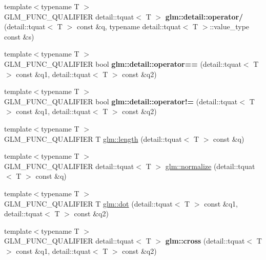 \begin{DoxyCompactItemize}
\item 
\hypertarget{namespaceglm_1_1detail_a47775e56016984a714086b0d4e1dc673}{}{\footnotesize template$<$typename T $>$ }\\G\+L\+M\+\_\+\+F\+U\+N\+C\+\_\+\+Q\+U\+A\+L\+I\+F\+I\+E\+R detail\+::tquat$<$ T $>$ {\bfseries glm\+::detail\+::operator/} (detail\+::tquat$<$ T $>$ const \&q, typename detail\+::tquat$<$ T $>$\+::value\+\_\+type const \&s)\label{namespaceglm_1_1detail_a47775e56016984a714086b0d4e1dc673}

\item 
\hypertarget{namespaceglm_1_1detail_a96329fbb8f896966d3c4d389ae2c9716}{}{\footnotesize template$<$typename T $>$ }\\G\+L\+M\+\_\+\+F\+U\+N\+C\+\_\+\+Q\+U\+A\+L\+I\+F\+I\+E\+R bool {\bfseries glm\+::detail\+::operator==} (detail\+::tquat$<$ T $>$ const \&q1, detail\+::tquat$<$ T $>$ const \&q2)\label{namespaceglm_1_1detail_a96329fbb8f896966d3c4d389ae2c9716}

\item 
\hypertarget{namespaceglm_1_1detail_aa7964957d37518ed89c2d08e2b33cd79}{}{\footnotesize template$<$typename T $>$ }\\G\+L\+M\+\_\+\+F\+U\+N\+C\+\_\+\+Q\+U\+A\+L\+I\+F\+I\+E\+R bool {\bfseries glm\+::detail\+::operator!=} (detail\+::tquat$<$ T $>$ const \&q1, detail\+::tquat$<$ T $>$ const \&q2)\label{namespaceglm_1_1detail_aa7964957d37518ed89c2d08e2b33cd79}

\item 
{\footnotesize template$<$typename T $>$ }\\G\+L\+M\+\_\+\+F\+U\+N\+C\+\_\+\+Q\+U\+A\+L\+I\+F\+I\+E\+R T \hyperlink{group__gtc__quaternion_ga60d5647f87c2c423497d0f3bf8c407b8}{glm\+::length} (detail\+::tquat$<$ T $>$ const \&q)
\item 
{\footnotesize template$<$typename T $>$ }\\G\+L\+M\+\_\+\+F\+U\+N\+C\+\_\+\+Q\+U\+A\+L\+I\+F\+I\+E\+R detail\+::tquat$<$ T $>$ \hyperlink{group__gtc__quaternion_gabd269bb967469a6f1df5963455fee6be}{glm\+::normalize} (detail\+::tquat$<$ T $>$ const \&q)
\item 
{\footnotesize template$<$typename T $>$ }\\G\+L\+M\+\_\+\+F\+U\+N\+C\+\_\+\+Q\+U\+A\+L\+I\+F\+I\+E\+R T \hyperlink{group__gtc__quaternion_gab9101d7f5b27ca682fc84e32b8fd70ad}{glm\+::dot} (detail\+::tquat$<$ T $>$ const \&q1, detail\+::tquat$<$ T $>$ const \&q2)
\item 
\hypertarget{namespaceglm_aa097c896b3eae629723dd87304e3f061}{}{\footnotesize template$<$typename T $>$ }\\G\+L\+M\+\_\+\+F\+U\+N\+C\+\_\+\+Q\+U\+A\+L\+I\+F\+I\+E\+R detail\+::tquat$<$ T $>$ {\bfseries glm\+::cross} (detail\+::tquat$<$ T $>$ const \&q1, detail\+::tquat$<$ T $>$ const \&q2)\label{namespaceglm_aa097c896b3eae629723dd87304e3f061}


\end{DoxyCompactItemize}

